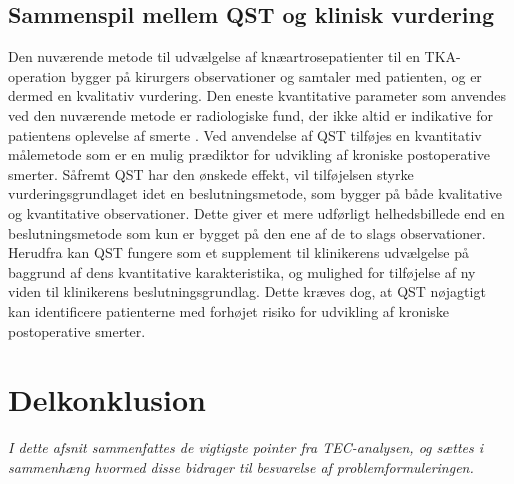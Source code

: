 \subsection{Sammenspil mellem QST og klinisk vurdering} 
Den nuværende metode til udvælgelse af knæartrosepatienter til en TKA-operation bygger på kirurgers observationer og samtaler med patienten, og er dermed en kvalitativ vurdering. \citep{Troelsen2012} \citep{skou2016} Den eneste kvantitative parameter som anvendes ved den nuværende metode er radiologiske fund, der ikke altid er indikative for patientens oplevelse af smerte \citep{Leary2016}. Ved anvendelse af QST tilføjes en kvantitativ målemetode som er en mulig prædiktor for udvikling af kroniske postoperative smerter. Såfremt QST har den ønskede effekt, vil tilføjelsen styrke vurderingsgrundlaget idet en beslutningsmetode, som bygger på både kvalitative og kvantitative observationer. Dette giver et mere udførligt helhedsbillede end en beslutningsmetode som kun er bygget på den ene af de to slags observationer. \citep{Gronmo2012} \\
Herudfra kan QST fungere som et supplement til klinikerens udvælgelse på baggrund af dens kvantitative karakteristika, og mulighed for tilføjelse af ny viden til klinikerens beslutningsgrundlag. Dette kræves dog, at QST nøjagtigt kan identificere patienterne med forhøjet risiko for udvikling af kroniske postoperative smerter.   

\section{Delkonklusion}
\textit{I dette afsnit sammenfattes de vigtigste pointer fra TEC-analysen, og sættes i sammenhæng hvormed disse bidrager til besvarelse af problemformuleringen.}

